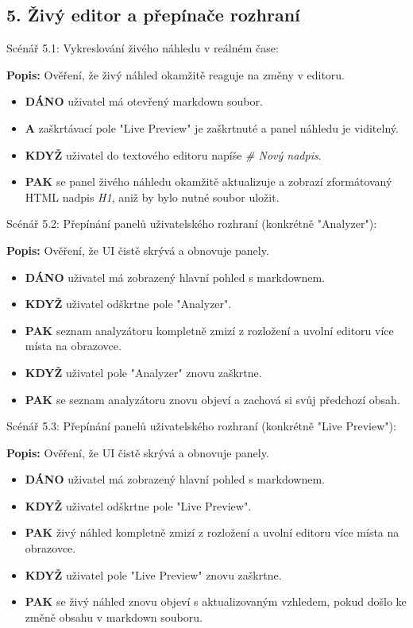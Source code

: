 \documentclass[12pt, a4paper]{article}
\begin{document}
\subsection*{5. Živý editor a přepínače rozhraní}

Scénář 5.1: Vykreslování živého náhledu v reálném čase:

\textbf{Popis:} Ověření, že živý náhled okamžitě reaguje na změny v editoru.
\begin{itemize}
    \item \textbf{DÁNO} uživatel má otevřený markdown soubor.
    \item \textbf{A} zaškrtávací pole "Live Preview" je zaškrtnuté a panel náhledu je viditelný.
    \item \textbf{KDYŽ} uživatel do textového editoru napíše \textit{\# Nový nadpis}.
    \item \textbf{PAK} se panel živého náhledu okamžitě aktualizuje a zobrazí zformátovaný HTML nadpis \textit{H1}, aniž by bylo nutné soubor uložit.
\end{itemize}

Scénář 5.2: Přepínání panelů uživatelského rozhraní (konkrétně "Analyzer"):

\textbf{Popis:} Ověření, že UI čistě skrývá a obnovuje panely.
\begin{itemize}
    \item \textbf{DÁNO} uživatel má zobrazený hlavní pohled s markdownem.
    \item \textbf{KDYŽ} uživatel odškrtne pole "Analyzer".
    \item \textbf{PAK} seznam analyzátoru kompletně zmizí z rozložení a uvolní editoru více místa na obrazovce.
    \item \textbf{KDYŽ} uživatel pole "Analyzer" znovu zaškrtne.
    \item \textbf{PAK} se seznam analyzátoru znovu objeví a zachová si svůj předchozí obsah.
\end{itemize}

Scénář 5.3: Přepínání panelů uživatelského rozhraní (konkrétně "Live Preview"):

\textbf{Popis:} Ověření, že UI čistě skrývá a obnovuje panely.
\begin{itemize}
    \item \textbf{DÁNO} uživatel má zobrazený hlavní pohled s markdownem.
    \item \textbf{KDYŽ} uživatel odškrtne pole "Live Preview".
    \item \textbf{PAK} živý náhled kompletně zmizí z rozložení a uvolní editoru více místa na obrazovce.
    \item \textbf{KDYŽ} uživatel pole "Live Preview" znovu zaškrtne.
    \item \textbf{PAK} se živý náhled znovu objeví s aktualizovaným vzhledem, pokud došlo ke změně obsahu v markdown souboru.
\end{itemize}
\end{document}
